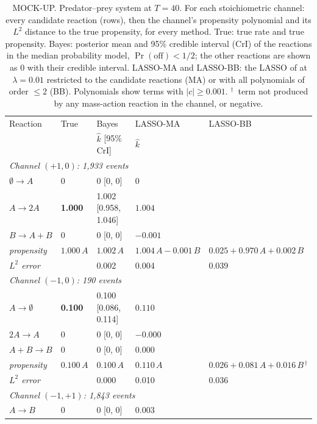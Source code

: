 \begin{table}[htbp]
\centering
\footnotesize
\setlength{\tabcolsep}{3pt}
\caption{MOCK-UP. Predator--prey system at $T=40$. For each stoichiometric channel: every candidate reaction (rows), then the channel's propensity polynomial and its $L^2$ distance to the true propensity, for every method. True: true rate and true propensity. Bayes: posterior mean and 95\% credible interval (CrI) of the reactions in the median probability model, $\Pr(\text{off})<1/2$; the other reactions are shown as $0$ with their credible interval. LASSO-MA and LASSO-BB: the LASSO of \cite{siam_Zhang2019} at $\lambda=0.01$ restricted to the candidate reactions (MA) or with all polynomials of order $\le 2$ (BB). Polynomials show terms with $|c|\ge 0.001$. $^\dagger$~term not produced by any mass-action reaction in the channel, or negative.}
\begin{tabular}{l l l l l}
\toprule
Reaction & True & Bayes & LASSO-MA & LASSO-BB \\
 & & $\hat k$ [95\% CrI] & $\hat k$ & \\
\midrule
\multicolumn{5}{l}{\textit{Channel $(+1,0)$: 1{,}933 events}} \\
\quad $\emptyset\to A$ & $0$ & 0 [0, 0] & $0$ &  \\
\quad $A\to 2A$ & \textbf{1.000} & 1.002 [0.958, 1.046] & $1.004$ &  \\
\quad $B\to A+B$ & $0$ & 0 [0, 0] & $-0.001$ &  \\
\qquad\quad \textit{propensity} & $1.000\,A$ & $1.002\,A$ & $1.004\,A - 0.001\,B$ & $0.025 + 0.970\,A + 0.002\,B$ \\
\qquad\quad \textit{$L^2$ error} & & 0.002 & 0.004 & 0.039 \\
\midrule
\multicolumn{5}{l}{\textit{Channel $(-1,0)$: 190 events}} \\
\quad $A\to \emptyset$ & \textbf{0.100} & 0.100 [0.086, 0.114] & $0.110$ &  \\
\quad $2A\to A$ & $0$ & 0 [0, 0] & $-0.000$ &  \\
\quad $A+B\to B$ & $0$ & 0 [0, 0] & $0.000$ &  \\
\qquad\quad \textit{propensity} & $0.100\,A$ & $0.100\,A$ & $0.110\,A$ & $0.026 + 0.081\,A + 0.016\,B{}^{\,\dagger}$ \\
\qquad\quad \textit{$L^2$ error} & & 0.000 & 0.010 & 0.036 \\
\midrule
\multicolumn{5}{l}{\textit{Channel $(-1,+1)$: 1{,}843 events}} \\
\quad $A\to B$ & $0$ & 0 [0, 0] & $0.003$ &  \\

\end{tabular}
\end{table}
